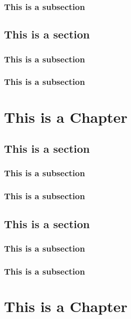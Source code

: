 \documentclass[11pt,oneside]{book}
\begin{document}
\subsection{This is a subsection}
\lipsum[1-2]

\section{This is a section}
\subsection{This is a subsection}
\lipsum[1-1]
\subsection{This is a subsection}
\lipsum[1-2]


\appendix
\chapter{This is a Chapter}
\section{This is a section}
\subsection{This is a subsection}
\lipsum[1-3]

\subsection{This is a subsection}
\lipsum[1-2]

\section{This is a section}
\subsection{This is a subsection}
\lipsum[1-1]
\subsection{This is a subsection}
\lipsum[1-2]

\chapter{This is a Chapter}
\end{document}
